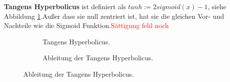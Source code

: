 \documentclass[12pt,a4paper]{scrartcl}
\numberwithin{equation}{section}
\begin{document}
\textbf{Tangens Hyperbolicus} ist definiert als	$ tanh := 2sigmoid(x) -1$, siehe Abbildung \ref{fig:tanh}.Außer dass sie null zentriert ist, hat sie die gleichen Vor- und Nachteile wie die Sigmoid Funktion.\textcolor{red}{Sättigung fehl noch}
\begin{figure}[h]
	\caption{Tangens Hyperbolicus.}
	\begin{subfigure}{.5\textwidth}	
		\centering	
		\caption{Tangens Hyperbolicus.}
	\end{subfigure}%
	\begin{subfigure}{.5\textwidth}		
		\centering
		\caption{Ableitung der Tangens Hyperbolicus.}
	\end{subfigure}
	\label{fig:tanh}		
\end{figure}
\end{document}
